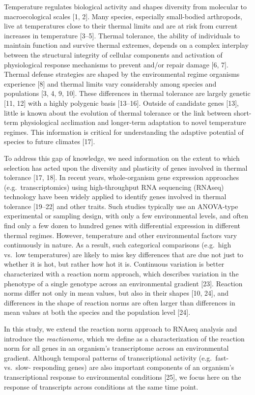 \documentclass[]{article}
\begin{document}
Temperature regulates biological activity and shapes diversity from
molecular to macroecological scales {[}1, 2{]}. Many species, especially
small-bodied arthropods, live at temperatures close to their thermal
limits and are at risk from current increases in temperature {[}3--5{]}.
Thermal tolerance, the ability of individuals to maintain function and
survive thermal extremes, depends on a complex interplay between the
structural integrity of cellular components and activation of
physiological response mechanisms to prevent and/or repair damage {[}6,
7{]}. Thermal defense strategies are shaped by the environmental regime
organisms experience {[}8{]} and thermal limits vary considerably among
species and populations {[}3, 4, 9, 10{]}. These differences in thermal
tolerance are largely genetic {[}11, 12{]} with a highly polygenic basis
{[}13--16{]}. Outside of candidate genes {[}13{]}, little is known about
the evolution of thermal tolerance or the link between short-term
physiological acclimation and longer-term adaptation to novel
temperature regimes. This information is critical for understanding the
adaptive potential of species to future climates {[}17{]}.

To address this gap of knowledge, we need information on the extent to
which selection has acted upon the diversity and plasticity of genes
involved in thermal tolerance {[}17, 18{]}. In recent years,
whole-organism gene expression approaches (e.g.~transcriptomics) using
high-throughput RNA sequencing (RNAseq) technology have been widely
applied to identify genes involved in thermal tolerance {[}19--22{]} and
other traits. Such studies typically use an ANOVA-type experimental or
sampling design, with only a few environmental levels, and often find
only a few dozen to hundred genes with differential expression in
different thermal regimes. However, temperature and other environmental
factors vary continuously in nature. As a result, such categorical
comparisons (e.g.~high vs.~low temperatures) are likely to miss key
differences that are due not just to whether it is hot, but rather how
hot it is. Continuous variation is better characterized with a reaction
norm approach, which describes variation in the phenotype of a single
genotype across an environmental gradient {[}23{]}. Reaction norms
differ not only in mean values, but also in their shapes {[}10, 24{]},
and differences in the shape of reaction norms are often larger than
differences in mean values at both the species and the population level
{[}24{]}.

In this study, we extend the reaction norm approach to RNAseq analysis
and introduce the \emph{reactionome}, which we define as a
characterization of the reaction norm for all genes in an organism's
transcriptome across an environmental gradient. Although temporal
patterns of transcriptional activity (e.g.~fast- vs.~slow- responding
genes) are also important components of an organism's transcriptional
response to environmental conditions {[}25{]}, we focus here on the
response of transcripts across conditions at the same time point.
\end{document}
